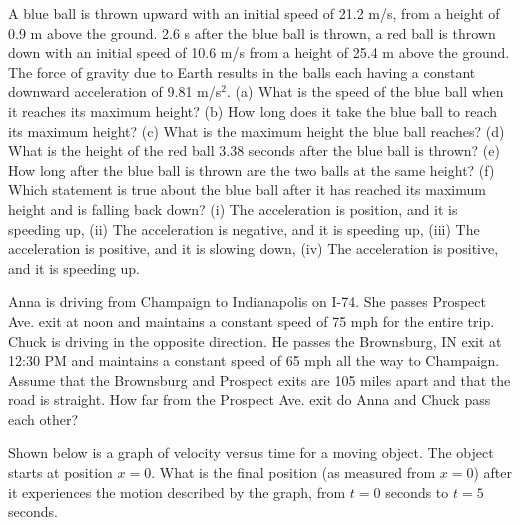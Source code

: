 \documentclass[]{flipit}
\begin{document}
\begin{question}
    \item A blue ball is thrown upward with an initial speed of 21.2 m/s, from a height of 0.9 m above the ground. 2.6 s after the blue ball is thrown, a red ball is thrown down with an initial speed of 10.6 m/s from a height of 25.4 m above the ground. The force of gravity due to Earth results in the balls each having a constant downward acceleration of 9.81 m/s$^2$. (a) What is the speed of the blue ball when it reaches its maximum height? (b) How long does it take the blue ball to reach its maximum height? (c) What is the maximum height the blue ball reaches? (d) What is the height of the red ball 3.38 seconds after the blue ball is thrown? (e) How long after the blue ball is thrown are the two balls at the same height? (f) Which statement is true about the blue ball after it has reached its maximum height and is falling back down? (i) The acceleration is position, and it is speeding up, (ii) The acceleration is negative, and it is speeding up, (iii) The acceleration is positive, and it is slowing down, (iv) The acceleration is positive, and it is speeding up.
\end{question}


\begin{question}
    \item Anna is driving from Champaign to Indianapolis on I-74. She passes Prospect Ave. exit at noon and maintains a constant speed of 75 mph for the entire trip. Chuck is driving in the opposite direction. He passes the Brownsburg, IN exit at 12:30 PM and maintains a constant speed of 65 mph all the way to Champaign. Assume that the Brownsburg and Prospect exits are 105 miles apart and that the road is straight. How far from the Prospect Ave. exit do Anna and Chuck pass each other?
\end{question}



\begin{question}
    \item Shown below is a graph of velocity versus time for a moving object. The object starts at position $x=0$. What is the final position (as measured from $x=0$) after it experiences the motion described by the graph, from $t=0$ seconds to $t=5$ seconds.
\end{question}

\end{document}
